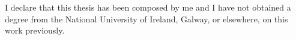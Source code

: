 
\begin{declaration}

I declare that this thesis has been composed by me and I have not obtained a degree from the National University of Ireland, Galway, or elsewhere, on this work previously.


\end{declaration}

